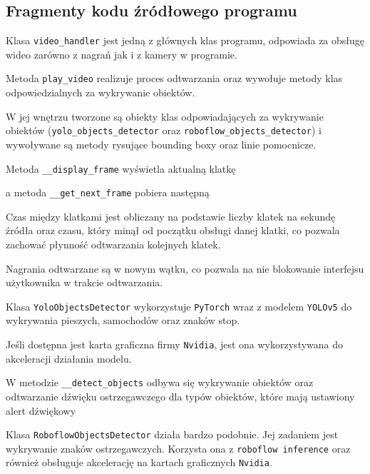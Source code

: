 \subsection{Fragmenty kodu źródłowego programu}

Klasa \verb|video_handler| jest jedną z głównych klas programu, odpowiada za obsługę wideo zarówno z nagrań jak i z kamery w programie.

Metoda \verb|play_video| realizuje proces odtwarzania oraz wywołuje metody klas odpowiedzialnych za wykrywanie obiektów.



W jej wnętrzu tworzone są obiekty klas odpowiadających za wykrywanie obiektów (\verb|yolo_objects_detector| oraz \verb|roboflow_objects_detector|) i wywoływane są metody rysujące bounding boxy oraz linie pomocnicze.

Metoda \verb|__display_frame| wyświetla aktualną klatkę


a metoda \verb|__get_next_frame| pobiera następną


Czas między klatkami jest obliczany na podstawie liczby klatek na sekundę źródła oraz czasu, który minął od początku obsługi danej klatki, co pozwala zachować płynność odtwarzania kolejnych klatek.



Nagrania odtwarzane są w nowym wątku, co pozwala na nie blokowanie interfejsu użytkownika w trakcie odtwarzania.



Klasa \verb|YoloObjectsDetector| wykorzystuje \verb|PyTorch| wraz z  modelem \verb|YOLOv5| do wykrywania pieszych, samochodów oraz znaków stop.

Jeśli dostępna jest karta graficzna firmy \verb|Nvidia|, jest ona wykorzystywana do akceleracji działania modelu.


W metodzie \verb|__detect_objects| odbywa się wykrywanie obiektów oraz odtwarzanie dźwięku ostrzegawczego dla typów obiektów, które mają ustawiony alert dźwiękowy


Klasa \verb|RoboflowObjectsDetector| działa bardzo podobnie. Jej zadaniem jest wykrywanie znaków ostrzegawczych. Korzysta ona z \verb|roboflow inference| oraz również obsługuje akcelerację na kartach graficznych \verb|Nvidia|.

